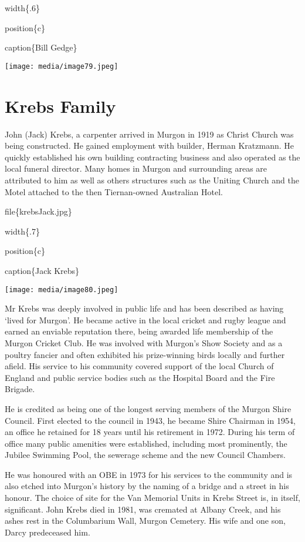 width\{.6\}

position\{c\}

caption\{Bill Gedge\}

\texttt{[image: media/image79.jpeg]}

\hypertarget{krebs-family}{%
\section{Krebs Family}\label{krebs-family}}

John (Jack) Krebs, a carpenter arrived in Murgon in 1919 as Christ Church was being constructed. He gained employment with builder, Herman Kratzmann. He quickly established his own building contracting business and also operated as the local funeral director. Many homes in Murgon and surrounding areas are attributed to him as well as others structures such as the Uniting Church and the Motel attached to the then Tiernan-owned Australian Hotel.

file\{krebsJack.jpg\}

width\{.7\}

position\{c\}

caption\{Jack Krebs\}

\texttt{[image: media/image80.jpeg]}

Mr Krebs was deeply involved in public life and has been described as having `lived for Murgon'. He became active in the local cricket and rugby league and earned an enviable reputation there, being awarded life membership of the Murgon Cricket Club. He was involved with Murgon's Show Society and as a poultry fancier and often exhibited his prize-winning birds locally and further afield. His service to his community covered support of the local Church of England and public service bodies such as the Hospital Board and the Fire Brigade.

He is credited as being one of the longest serving members of the Murgon Shire Council. First elected to the council in 1943, he became Shire Chairman in 1954, an office he retained for 18 years until his retirement in 1972. During his term of office many public amenities were established, including most prominently, the Jubilee Swimming Pool, the sewerage scheme and the new Council Chambers.

He was honoured with an OBE in 1973 for his services to the community and is also etched into Murgon's history by the naming of a bridge and a street in his honour. The choice of site for the Van Memorial Units in Krebs Street is, in itself, significant. John Krebs died in 1981, was cremated at Albany Creek, and his ashes rest in the Columbarium Wall, Murgon Cemetery. His wife and one son, Darcy predeceased him.

